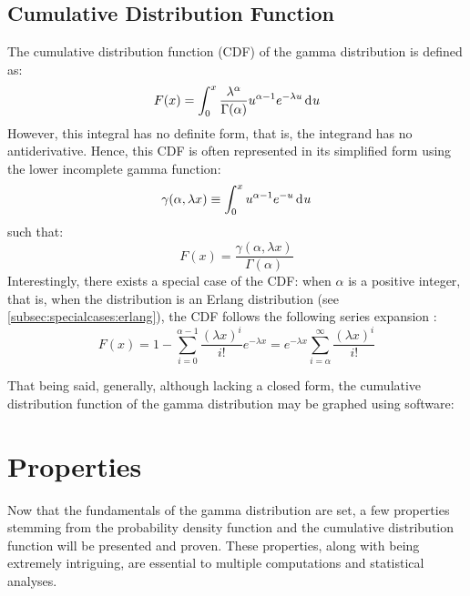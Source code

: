\documentclass[12pt]{article}
\begin{document}
\subsection{Cumulative Distribution Function}\label{subsec:gamma:cdf} The cumulative distribution
function (CDF) of the gamma distribution is defined as:
\begin{equation}
	F(x) = \int^x_0\frac{\lambda^\alpha}{\Gamma(\alpha)}u^{\alpha-1}e^{-\lambda u}\mathop{}\!\mathrm{d^{}}u
\end{equation}
However, this integral has no definite form, that is, the integrand has no antiderivative. Hence, this CDF is often
represented in its simplified form using the lower incomplete gamma function\cite{weissteinIncompleteGammaFunction}:
\begin{equation}
	\gamma(\alpha, \lambda x)\equiv\int^x_0u^{\alpha-1}e^{-u}\mathop{}\!\mathrm{d^{}}u
\end{equation}
such that:
\begin{equation}
	F(x) = \frac{\gamma(\alpha, \lambda x)}{\Gamma(\alpha)}
\end{equation}
Interestingly, there exists a special case of the CDF: when $\alpha$ is a positive integer, that is, when the distribution
is an Erlang distribution (see \autoref{subsec:specialcases:erlang}), the CDF follows the following series expansion
\cite{wikipediaGammaDistribution2022}:
\begin{equation}
	F(x) = 1-\sum^{\alpha-1}_{i=0}\frac{(\lambda x)^i}{i!}e^{-\lambda x} = e^{-\lambda x}\sum^\infty_{i=\alpha}\frac{(\lambda x)^i}{i!}
\end{equation}

\pagebreak
That being said, generally, although lacking a closed form, the cumulative distribution function of the gamma
distribution may be graphed using software:


\pagebreak
\section{Properties}
Now that the fundamentals of the gamma distribution are set, a few properties stemming from the probability density
function and the cumulative distribution function will be presented and proven. These properties, along
with being extremely intriguing, are essential to multiple computations and statistical analyses.
\end{document}
